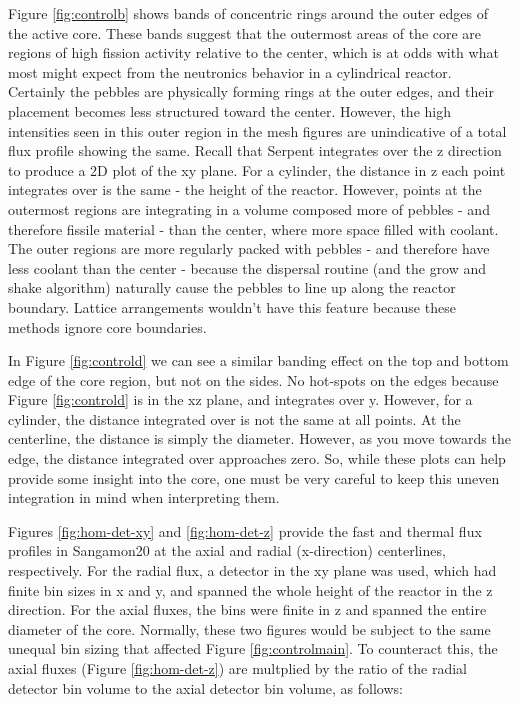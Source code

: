Figure \ref{fig:controlb} shows bands of concentric rings around the outer edges of the active core.  These bands suggest that the outermost areas of the core are regions of high fission activity relative to the center, which is at odds with what most might expect from the neutronics behavior in a cylindrical reactor.  Certainly the pebbles are physically forming rings at the outer edges, and their placement becomes less structured toward the center.  However, the high intensities seen in this outer region in the mesh figures are unindicative of a total flux profile showing the same.  Recall that Serpent integrates over the z direction to produce a 2D plot of the xy plane.  For a cylinder, the distance in z each point integrates over is the same - the height of the reactor.  However, points at the outermost regions are integrating in a volume composed more of pebbles - and therefore fissile material - than the center, where more space filled with coolant.  The outer regions are more regularly packed with pebbles - and therefore have less coolant than the center - because the dispersal routine (and the grow and shake algorithm) naturally cause the pebbles to line up along the reactor boundary.  Lattice arrangements wouldn't have this feature because these methods ignore core boundaries.

In Figure \ref{fig:controld} we can see a similar banding effect on the top and bottom edge of the core region, but not on the sides.  No hot-spots on the edges because Figure \ref{fig:controld} is in the xz plane, and integrates over y.  However, for a cylinder, the distance integrated over is not the same at all points.  At the centerline, the distance is simply the diameter.  However, as you move towards the edge, the distance integrated over approaches zero.  So, while these plots can help provide some insight into the core, one must be very careful to keep this uneven integration in mind when interpreting them.




Figures \ref{fig:hom-det-xy} and \ref{fig:hom-det-z} provide the fast and thermal flux profiles in Sangamon20 at the axial and radial (x-direction) centerlines, respectively.  For the radial flux, a detector in the xy plane was used, which had finite bin sizes in x and y, and spanned the whole height of the reactor in the z direction.  For the axial fluxes, the bins were finite in z and spanned the entire diameter of the core.  Normally, these two figures would be subject to the same unequal bin sizing that affected Figure \ref{fig:controlmain}.  To counteract this, the axial fluxes (Figure \ref{fig:hom-det-z}) are multplied by the ratio of the radial detector bin volume to the axial detector bin volume, as follows:

